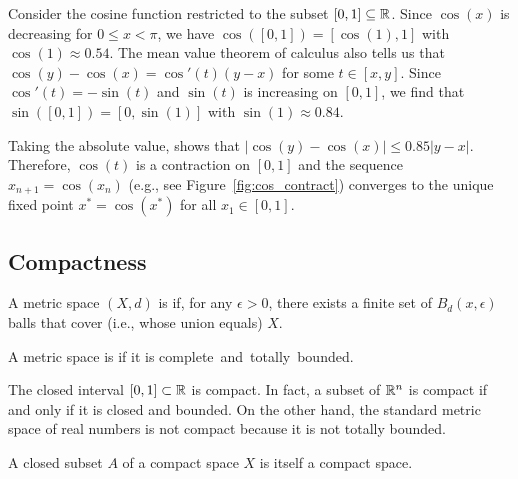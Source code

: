 \begin{example} \label{exa:cos_contract}
Consider the cosine function restricted to the subset $[0,1]\subseteq \mathbb{R}$.
Since $\cos(x)$ is decreasing for $0 \leq x < \pi$, we have $\cos([0,1]) = [\cos(1),1]$ with $\cos(1) \approx 0.54$.
The mean value theorem of calculus also tells us that $\cos(y) - \cos(x) = \cos '(t) (y-x)$ for some $t\in [x,y]$.
Since $\cos '(t) = -\sin(t)$ and $\sin(t)$ is increasing on $[0,1]$, we find that $\sin([0,1]) = [0,\sin(1)]$ with $\sin(1) \approx 0.84$.

Taking the absolute value, shows that $| \cos(y) - \cos(x) | \leq 0.85 |y-x|$.
Therefore, $\cos(t)$ is a contraction on $[0,1]$ and the sequence $x_{n+1} = \cos(x_n)$ (e.g., see Figure~\ref{fig:cos_contract}) converges to the unique fixed point $x^* = \cos(x^*)$ for all $x_1 \in [0,1]$.
\end{example}



\subsection{Compactness}
\label{sec:metspace_compact}

\begin{definition}
A metric space $(X,d)$ is  if, for any $\epsilon > 0$, there exists a finite set of $B_d (x,\epsilon)$ balls that cover (i.e., whose union equals) $X$.
\end{definition}

\begin{definition}
A metric space is  if it is complete~and~totally~bounded.
\end{definition}

The closed interval $[0,1]\subset \mathbb{R}$ is compact.
In fact, a subset of $\mathbb{R}^n$ is compact if and only if it is closed and bounded.
On the other hand, the standard metric space of real numbers is not compact because it is not totally bounded.

\begin{theorem}
\label{thm:CompactClosedSubsetCompact}
A closed subset $A$ of a compact space $X$ is itself a compact space.
\end{theorem}

